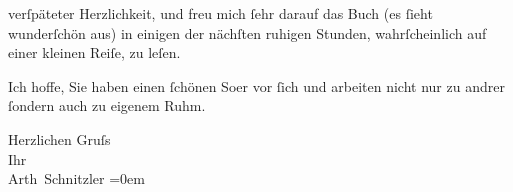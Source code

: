                verſpäteter Herzlichkeit, und freu mich{ }ſehr darauf das Buch (es{ }ſieht wunderſchön aus) in einigen
               der nächſten ruhigen Stunden, {\pb}wahrſcheinlich auf einer
               kleinen Reiſe, zu leſen.\pend
           
\pstart
           Ich hoffe, Sie haben einen{ }ſchönen So{\geminationm}er vor{ }ſich und arbeiten nicht nur zu andrer{ }ſondern
               auch zu eigenem Ruhm.\pend
           
\pstart
           Herzlichen Gruſs{\\[\baselineskip]}Ihr{\\[\baselineskip]}\spacefill\mbox{Arth Schnitzler}\pend
           \leftskip=0em{}\endnumbering{}  \newcommand{\dateiname}{L03764}\newcommand{\titel}{Arthur Schnitzler an Stefan Zweig, 24. 7. 1910}\newcommand{\editorInnen}{Selma Jahnke und Martin Anton Müller}
